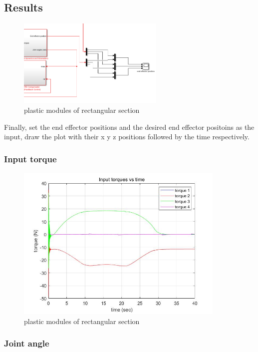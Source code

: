 \subsection{Results}

\begin{figure}[htbp]
    \centering
    \includegraphics[width=7cm]{./fig/re.png}
    \caption{plastic modules of rectangular section}
    \label{f1}
\end{figure}

Finally, set the end effector positions and the desired end effector positoins as the input, draw the plot with their x y z positions followed by the time respectively.

\subsubsection*{Input torque}

\begin{figure}[htbp]
    \centering
    \includegraphics[width=10cm]{./fig/3.jpg}
    \caption{plastic modules of rectangular section}
    \label{f1}
\end{figure}


\subsubsection*{Joint angle}

